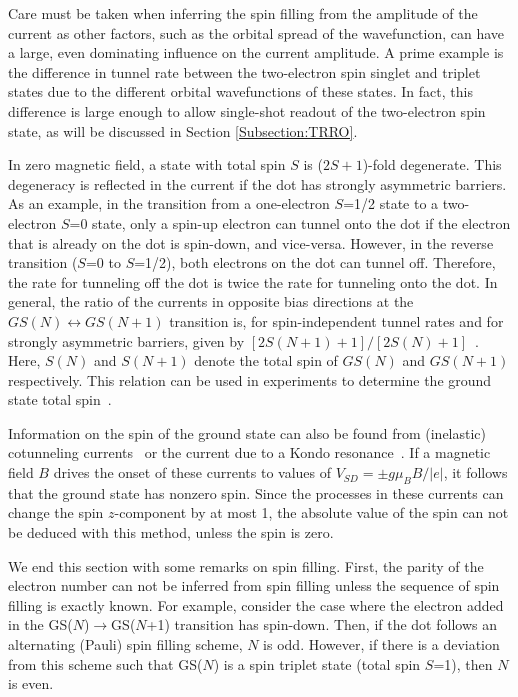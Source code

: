 \documentclass[rmp,twocolumn,aps]{revtex4}
\begin{document}
Care must be taken when inferring the spin filling from the amplitude of the current as other factors, such as the orbital spread of the wavefunction, can have a large, even dominating influence on the current amplitude. A prime example is the difference in tunnel rate between the two-electron spin singlet and triplet states due to the different orbital wavefunctions of these states. In fact, this difference is large enough to allow single-shot readout of the two-electron spin state, as will be discussed in Section \ref{Subsection:TRRO}.

In zero magnetic field, a state with total spin $S$ is
($2S+1$)-fold degenerate. This degeneracy is reflected in the
current if the dot has strongly asymmetric barriers. As an example, in the transition from a one-electron $S$=1/2 state to a two-electron $S$=0 state, only a spin-up electron can tunnel onto the dot if the electron that is already on the dot is spin-down, and vice-versa. However, in the reverse transition ($S$=0 to $S$=1/2), both electrons on the dot can tunnel off. Therefore, the rate for tunneling off the dot is twice the rate for tunneling onto the dot. In general, the ratio of the currents in opposite bias directions at the $GS(N)\leftrightarrow GS(N\!+\!1)$ transition is, for spin-independent tunnel rates and for strongly asymmetric barriers, given by $[2S(N\!+\!1)+1]/[2S(N)+1]$~\cite{Akera99}. Here, $S(N)$ and $S(N\!+\!1)$ denote the total spin of $GS(N)$ and $GS(N\!+\!1)$ respectively. This
relation can be used in experiments to determine the ground state
total spin~\cite{Cobden98,Hayashi03}.

Information on the spin of the ground state can also be found from
(inelastic) cotunneling currents~\cite{KoganPRL2004} or the
current due to a Kondo resonance~\cite{Goldhaber98, Cronenwett98}. If a magnetic
field $B$ drives the onset of these currents to values of
$V_{SD}=\pm g \mu_B B/\left|e\right|$, it follows that the ground
state has nonzero spin. Since the processes in
these currents can change the spin $z$-component by at most 1, the
absolute value of the spin can not be deduced with this method,
unless the spin is zero.

We end this section with some remarks on spin filling. First, the
parity of the electron number can not be inferred from spin
filling unless the sequence of spin filling is exactly known. For
example, consider the case where the electron added in the
GS($N$)$\rightarrow$GS($N$+1) transition has spin-down. Then, if
the dot follows an alternating (Pauli) spin filling scheme, $N$ is
odd. However, if there is a deviation from this scheme such that
GS($N$) is a spin triplet state (total spin $S$=1), then $N$ is
even.
\end{document}
